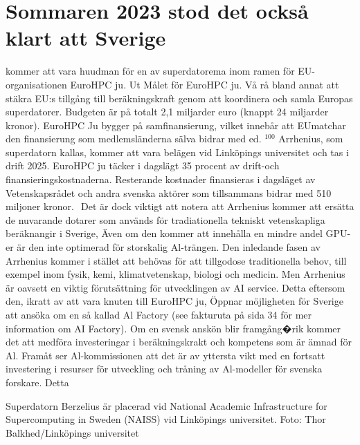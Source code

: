 {\section*{Sommaren 2023 stod det också klart att Sverige} kommer att vara huudman för en av superdatorema inom ramen för EU-organisationen EuroHPC ju. Ut
Målet för EuroHPC ju. Vå rå bland annat att stäkra EU:s tillgång till beräkningskraft genom att koordinera och samla Europas superdatorer. Budgeten är på totalt 2,1 miljarder euro (knappt 24 miljarder kronor). EuroHPC Ju bygger på samfinansierung, vilket innebår att EUmatchar den finansierung som medlemsländerna sälva bidrar med ed. \({ }^{100}\)
Arrhenius, som superdatorn kallas, kommer att vara belägen vid Linköpings universitet och tas i drift 2025.
EuroHPC ju täcker i dagslägt 35 procent av drift-och finansieringskostnaderna. Resterande kostnader finansieras i dagsläget av Vetenskapsrådet och andra svenska aktörer som tillsammans bidrar med 510 miljoner kronor. \({ }^{}\)
Det är dock viktigt att notera att Arrhenius kommer att ersätta de nuvarande dotarer som används för tradiationella tekniskt vetenskapliga beräknangir i Sverige, Även om den kommer att innehålla en mindre andel GPU-er är den inte optimerad för storskalig Al-trängen. Den inledande fasen av Arrhenius kommer i stället att behövas för att tillgodose traditionella behov, till exempel inom fysik, kemi, klimatvetenskap, biologi och medicin.
Men Arrhenius är oavsett en viktig förutsättning för utvecklingen av AI service. Detta eftersom den, ikratt av att vara knuten till EuroHPC ju, Öppnar möjligheten för Sverige att ansöka om en så kallad Al Factory (see fakturuta på sida 34 för mer information om AI Factory). Om en svensk anskön blir framgång�rik kommer det att medföra investeringar i beräkningskrakt och kompetens som är ämnad för Al.
Framåt ser Al-kommissionen att det är av yttersta vikt med en fortsatt investering i resurser för utveckling och tråning av Al-modeller för svenska forskare. Detta

Superdatorn Berzelius är placerad vid National Academic Infrastructure for Supercomputing in Sweden (NAISS) vid Linköpings universitet. Foto: Thor Balkhed/Linköpings universitet

}

